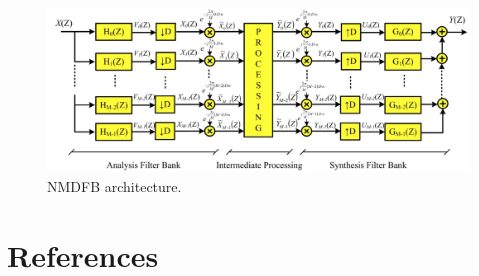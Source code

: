 \documentclass[letterpaper,10pt,twocolumn]{article} %
\begin{document}
\begin{figure}[htb]
\centering
\includegraphics[width=\textwidth]{NMDFBArchitecture.png}
\caption{NMDFB architecture.}
\label{fig:nmdfbarchitecture}
\end{figure}




\section{References}

 



%
{\small


}
    	
\end{document}

